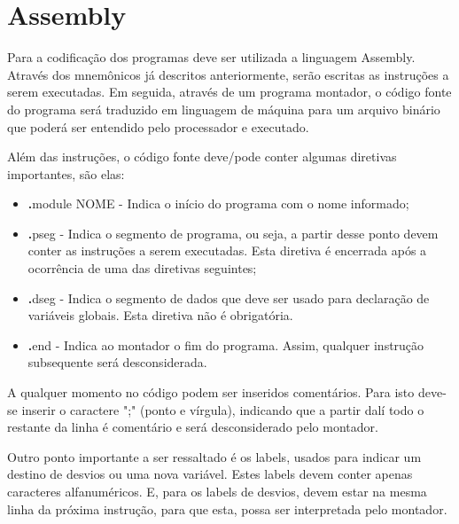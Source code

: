 \documentclass{report}
\begin{document}

\newpage
\section{Assembly}
Para a codificação dos programas deve ser utilizada a linguagem Assembly. Através dos mnemônicos já descritos anteriormente, serão escritas as instruções a serem executadas. Em seguida, através de um programa montador, o código fonte do programa será traduzido em linguagem de máquina para um arquivo binário que poderá ser entendido pelo processador e executado.\newline

Além das instruções, o código fonte deve/pode conter algumas diretivas importantes, são elas:

\begin{itemize}
\item \textbf .module NOME - Indica o início do programa com o nome informado;
\item \textbf .pseg - Indica o segmento de programa, ou seja, a partir desse ponto devem conter as instruções a serem executadas. Esta diretiva é encerrada após a ocorrência de uma das diretivas seguintes;
\item \textbf .dseg - Indica o segmento de dados que deve ser usado para declaração de variáveis globais. Esta diretiva não é obrigatória.
\item \textbf .end - Indica ao montador o fim do programa. Assim, qualquer instrução subsequente será desconsiderada.
\end{itemize}

A qualquer momento no código podem ser inseridos comentários. Para isto deve-se inserir o caractere ";" (ponto e vírgula), indicando que a partir dalí todo o restante da linha é comentário e será desconsiderado pelo montador.

Outro ponto importante a ser ressaltado é os labels, usados para indicar um destino de desvios ou uma nova variável. Estes labels devem conter apenas caracteres alfanuméricos. E, para os labels de desvios, devem estar na mesma linha da próxima instrução, para que esta, possa ser interpretada pelo montador.
\end{document}

